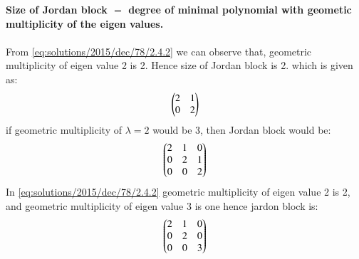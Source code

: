 \textbf{Size of Jordan block $=$ degree of minimal polynomial with geometic multiplicity of the eigen values.}\\\\
From \eqref{eq:solutions/2015/dec/78/2.4.2} we can observe that, geometric multiplicity of eigen value 2 is 2. Hence size of Jordan block is 2. which is given as:
\begin{align}
\begin{pmatrix}2 & 1 \\ 0 & 2 \end{pmatrix}
\end{align}
if geometric multiplicity of $\lambda = 2$ would be 3, then Jordan block would be:
\begin{align}
\begin{pmatrix}2 & 1 & 0 \\ 0 & 2 & 1 \\ 0 & 0 &2\end{pmatrix}
\end{align}
In \eqref{eq:solutions/2015/dec/78/2.4.2} geometric multiplicity of eigen value 2 is 2, and geometric multiplicity of eigen value 3 is one hence jardon block is:
\begin{align}
\begin{pmatrix}2 & 1 & 0 \\ 0 & 2 & 0 \\ 0 & 0 & 3\end{pmatrix}
\end{align}

